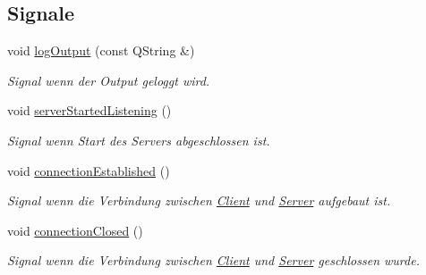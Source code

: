 \subsection*{Signale}
\begin{DoxyCompactItemize}
\item 
\hypertarget{class_iperf_interface_a8a0e602fe96d401f2ce61cf71f99d8da}{}\label{class_iperf_interface_a8a0e602fe96d401f2ce61cf71f99d8da} 
void \hyperlink{class_iperf_interface_a8a0e602fe96d401f2ce61cf71f99d8da}{log\+Output} (const Q\+String \&)
\begin{DoxyCompactList}\small\item\em Signal wenn der Output geloggt wird. \end{DoxyCompactList}\item 
\hypertarget{class_iperf_interface_a7263bbb7d6ee2285331b030d36efe6c6}{}\label{class_iperf_interface_a7263bbb7d6ee2285331b030d36efe6c6} 
void \hyperlink{class_iperf_interface_a7263bbb7d6ee2285331b030d36efe6c6}{server\+Started\+Listening} ()
\begin{DoxyCompactList}\small\item\em Signal wenn Start des Servers abgeschlossen ist. \end{DoxyCompactList}\item 
\hypertarget{class_iperf_interface_a51b38e37b0b7d1feb8ba02e34d7a2336}{}\label{class_iperf_interface_a51b38e37b0b7d1feb8ba02e34d7a2336} 
void \hyperlink{class_iperf_interface_a51b38e37b0b7d1feb8ba02e34d7a2336}{connection\+Established} ()
\begin{DoxyCompactList}\small\item\em Signal wenn die Verbindung zwischen \hyperlink{class_client}{Client} und \hyperlink{class_server}{Server} aufgebaut ist. \end{DoxyCompactList}\item 
\hypertarget{class_iperf_interface_a58a0afd22191a9e63d6fd8e8a047ce5b}{}\label{class_iperf_interface_a58a0afd22191a9e63d6fd8e8a047ce5b} 
void \hyperlink{class_iperf_interface_a58a0afd22191a9e63d6fd8e8a047ce5b}{connection\+Closed} ()
\begin{DoxyCompactList}\small\item\em Signal wenn die Verbindung zwischen \hyperlink{class_client}{Client} und \hyperlink{class_server}{Server} geschlossen wurde. \end{DoxyCompactList}\end{DoxyCompactItemize}
